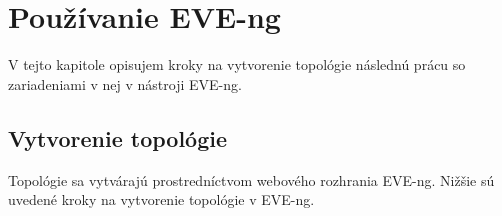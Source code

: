 \newpage

\section{Používanie EVE-ng}
\label{chap:pouzivanie_eve_ng}

V tejto kapitole opisujem kroky na vytvorenie topológie následnú prácu so zariadeniami v nej v nástroji EVE-ng.




\subsection{Vytvorenie topológie}
\label{chap:vytvorenie_topo_eve-ng}
Topológie sa vytvárajú prostredníctvom webového rozhrania EVE-ng. Nižšie sú uvedené kroky na vytvorenie topológie v EVE-ng.

